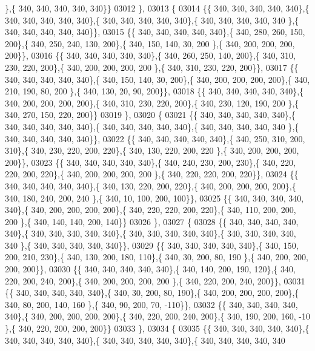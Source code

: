 \begin{DoxyCode}
      \},\{ 340, 340, 340, 340, 340\}\}
03012 \},
03013 \{
03014 \{\{ 340, 340, 340, 340, 340\},\{ 340, 340, 340, 340, 340\},\{ 340, 340, 340, 340, 340\},\{ 340, 340, 340, 340, 340
      \},\{ 340, 340, 340, 340, 340\}\},
03015 \{\{ 340, 340, 340, 340, 340\},\{ 340, 280, 260, 150, 200\},\{ 340, 250, 240, 130, 200\},\{ 340, 150, 140,  30, 200
      \},\{ 340, 200, 200, 200, 200\}\},
03016 \{\{ 340, 340, 340, 340, 340\},\{ 340, 260, 250, 140, 200\},\{ 340, 310, 230, 220, 200\},\{ 340, 200, 200, 200, 200
      \},\{ 340, 310, 230, 220, 200\}\},
03017 \{\{ 340, 340, 340, 340, 340\},\{ 340, 150, 140,  30, 200\},\{ 340, 200, 200, 200, 200\},\{ 340, 210, 190,  80, 200
      \},\{ 340, 130,  20,  90, 200\}\},
03018 \{\{ 340, 340, 340, 340, 340\},\{ 340, 200, 200, 200, 200\},\{ 340, 310, 230, 220, 200\},\{ 340, 230, 120, 190, 200
      \},\{ 340, 270, 150, 220, 200\}\}
03019 \},
03020 \{
03021 \{\{ 340, 340, 340, 340, 340\},\{ 340, 340, 340, 340, 340\},\{ 340, 340, 340, 340, 340\},\{ 340, 340, 340, 340, 340
      \},\{ 340, 340, 340, 340, 340\}\},
03022 \{\{ 340, 340, 340, 340, 340\},\{ 340, 250, 310, 200, 310\},\{ 340, 230, 220, 200, 220\},\{ 340, 130, 220, 200, 220
      \},\{ 340, 200, 200, 200, 200\}\},
03023 \{\{ 340, 340, 340, 340, 340\},\{ 340, 240, 230, 200, 230\},\{ 340, 220, 220, 200, 220\},\{ 340, 200, 200, 200, 200
      \},\{ 340, 220, 220, 200, 220\}\},
03024 \{\{ 340, 340, 340, 340, 340\},\{ 340, 130, 220, 200, 220\},\{ 340, 200, 200, 200, 200\},\{ 340, 180, 240, 200, 240
      \},\{ 340,  10, 100, 200, 100\}\},
03025 \{\{ 340, 340, 340, 340, 340\},\{ 340, 200, 200, 200, 200\},\{ 340, 220, 220, 200, 220\},\{ 340, 110, 200, 200, 200
      \},\{ 340, 140, 140, 200, 140\}\}
03026 \},
03027 \{
03028 \{\{ 340, 340, 340, 340, 340\},\{ 340, 340, 340, 340, 340\},\{ 340, 340, 340, 340, 340\},\{ 340, 340, 340, 340, 340
      \},\{ 340, 340, 340, 340, 340\}\},
03029 \{\{ 340, 340, 340, 340, 340\},\{ 340, 150, 200, 210, 230\},\{ 340, 130, 200, 180, 110\},\{ 340,  30, 200,  80, 190
      \},\{ 340, 200, 200, 200, 200\}\},
03030 \{\{ 340, 340, 340, 340, 340\},\{ 340, 140, 200, 190, 120\},\{ 340, 220, 200, 240, 200\},\{ 340, 200, 200, 200, 200
      \},\{ 340, 220, 200, 240, 200\}\},
03031 \{\{ 340, 340, 340, 340, 340\},\{ 340,  30, 200,  80, 190\},\{ 340, 200, 200, 200, 200\},\{ 340,  80, 200, 140, 160
      \},\{ 340,  90, 200,  70, -110\}\},
03032 \{\{ 340, 340, 340, 340, 340\},\{ 340, 200, 200, 200, 200\},\{ 340, 220, 200, 240, 200\},\{ 340, 190, 200, 160, -10
      \},\{ 340, 220, 200, 200, 200\}\}
03033 \},
03034 \{
03035 \{\{ 340, 340, 340, 340, 340\},\{ 340, 340, 340, 340, 340\},\{ 340, 340, 340, 340, 340\},\{ 340, 340, 340, 340, 340

\end{DoxyCode}
